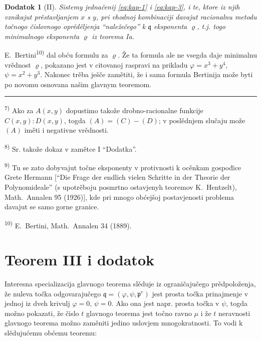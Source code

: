 \documentclass[11pt]{article}
\newcommand{\foreign}[1]{#1}
\theoremstyle{plain}
\newtheorem{zusatz}{Dodatok}
\begin{document}
\begin{zusatz}[II]
Sistemy jednačenij \eqref{eq:kap-1} i \eqref{eq:kap-3}, i te, ktore
iz njih vznikajut prěstavljanjem $x$ s $y$, pri vhodnoj kombinaciji
davajut racionalnu metodu točnogo čislovnogo oprěděljenja
``naležečego'' k $\mathfrak{q}$ eksponenta
$\varrho$, t.j. togo minimalnogo eksponenta $\varrho$ iz teorema Ia.
\end{zusatz}

E.\ Bertini\textsuperscript{10)} dal obću formulu za $\varrho$.
Že ta formula ale ne vsegda daje minimalnu vrědnost $\varrho$,
pokazano jest v citovanoj raspravi na prikladu
$\varphi = x^{3} + y^{4}$, $\psi = x^{2} + y^{3}$. Nakonec trěba
ješče zamětiti, že i sama formula Bertinija može byti po novomu
osnovana našim glavnym teoremom.

\vspace{0.5em}
\noindent\rule{\textwidth}{0.4pt}
\vspace{0.3em}

{\footnotesize
\textsuperscript{7)} Ako za $A(x,y)$ dopustimo takože drobno-racionalne
funkcije $C(x,y):D(x,y)$, togda $(A) = (C) - (D)$; v poslědnjem
slučaju može $(A)$ iměti i negativne vrědnosti.

\textsuperscript{8)} Sr. takože dokaz v zamětce I ``Dodatka''.

\textsuperscript{9)} Tu se zato dobyvajut točne eksponenty v protivnosti k
ocěnkam gospođice Grete Hermann [``\foreign{Die Frage der endlich vielen Schritte
in der Theorie der Polynomideale}'' (s upotrěboju posmrtno ostavjenyh
teoremov K.\ Hentzelt), \foreign{Math.\ Annalen} 95 (1926)], kde pri
mnogo obćejšoj postavjenosti problema davajut se samo gorne granice.

\textsuperscript{10)} E.\ Bertini, \foreign{Math.\ Annalen} 34 (1889).
}

\newpage
\section*{Teorem III i dodatok}

Interesna specializacija glavnogo teorema slěduje iz ograničajučego
prědpoloženja, že nuleva točka odgovarajučego
$\mathfrak{q} = (\varphi, \psi, \mathfrak{p}^{e})$ jest prosta
točka prinajmenje v jednoj iz dveh krivulj $\varphi = 0$, $\psi = 0$.
Ako ona jest napr. prosta točka v $\psi$, togda možno pokazati, že
čislo $t$ glavnogo teorema jest točno ravno $\mu$ i že $t$
neravnosti glavnogo teorema možno zaměniti jedino uslovjem
mnogokratnosti. To vodi k slědujućemu obćemu teoremu:
\end{document}
